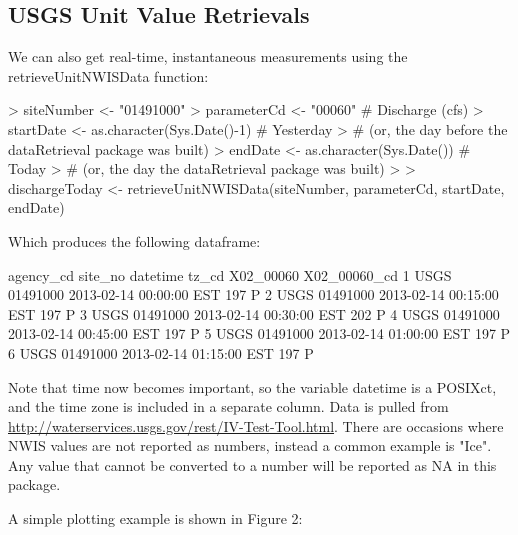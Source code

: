 \documentclass[a4paper,11pt]{article}
\begin{document}
\subsection{USGS Unit Value Retrievals}
We can also get real-time, instantaneous measurements using the retrieveUnitNWISData function:
\begin{Schunk}
\begin{Sinput}
> siteNumber <- "01491000"
> parameterCd <- "00060"  # Discharge (cfs)
> startDate <- as.character(Sys.Date()-1) # Yesterday 
>   # (or, the day before the dataRetrieval package was built)
> endDate <- as.character(Sys.Date()) # Today 
>   # (or, the day the dataRetrieval package was built)
> 
> dischargeToday <- retrieveUnitNWISData(siteNumber, parameterCd, 
         startDate, endDate)
\end{Sinput}
\end{Schunk}
Which produces the following dataframe:
\begin{Schunk}
\begin{Soutput}
  agency_cd  site_no            datetime tz_cd X02_00060 X02_00060_cd
1      USGS 01491000 2013-02-14 00:00:00   EST       197            P
2      USGS 01491000 2013-02-14 00:15:00   EST       197            P
3      USGS 01491000 2013-02-14 00:30:00   EST       202            P
4      USGS 01491000 2013-02-14 00:45:00   EST       197            P
5      USGS 01491000 2013-02-14 01:00:00   EST       197            P
6      USGS 01491000 2013-02-14 01:15:00   EST       197            P
\end{Soutput}
\end{Schunk}

Note that time now becomes important, so the variable datetime is a POSIXct, and the time zone is included in a separate column. Data is pulled from \url{http://waterservices.usgs.gov/rest/IV-Test-Tool.html}. There are occasions where NWIS values are not reported as numbers, instead a common example is "Ice".  Any value that cannot be converted to a number will be reported as NA in this package.

A simple plotting example is shown in Figure 2:
\begin{Schunk}
\end{Schunk}
\newpage
\end{document}
